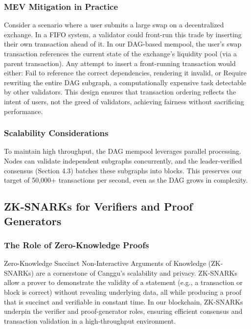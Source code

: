 \documentclass[12pt]{article}
\begin{document}
\subsubsection{MEV Mitigation in Practice}
\begin{justify}
    Consider a scenario where a user submits a large swap on a decentralized exchange. In a FIFO system, a validator could front-run this trade by inserting their own transaction ahead of it. In our DAG-based mempool, the user’s swap transaction references the current state of the exchange’s liquidity pool (via a parent transaction). Any attempt to insert a front-running transaction would either: Fail to reference the correct dependencies, rendering it invalid, or Require rewriting the entire DAG subgraph, a computationally expensive task detectable by other validators.
    This design ensures that transaction ordering reflects the intent of users, not the greed of validators, achieving fairness without sacrificing performance.
\end{justify}


\subsubsection{Scalability Considerations}
\begin{justify}
To maintain high throughput, the DAG mempool leverages parallel processing. Nodes can validate independent subgraphs concurrently, and the leader-verified consensus (Section 4.3) batches these subgraphs into blocks. This preserves our target of 50,000+ transactions per second, even as the DAG grows in complexity.
    
\end{justify}


\subsection{ZK-SNARKs for Verifiers and Proof Generators}
\subsubsection{The Role of Zero-Knowledge Proofs}
Zero-Knowledge Succinct Non-Interactive Arguments of Knowledge (ZK-SNARKs) are a cornerstone of Canggu’s scalability and privacy. ZK-SNARKs allow a prover to demonstrate the validity of a statement (e.g., a transaction or block is correct) without revealing underlying data, all while producing a proof that is succinct and verifiable in constant time. In our blockchain, ZK-SNARKs underpin the verifier and proof-generator roles, ensuring efficient consensus and transaction validation in a high-throughput environment.
\end{document}
